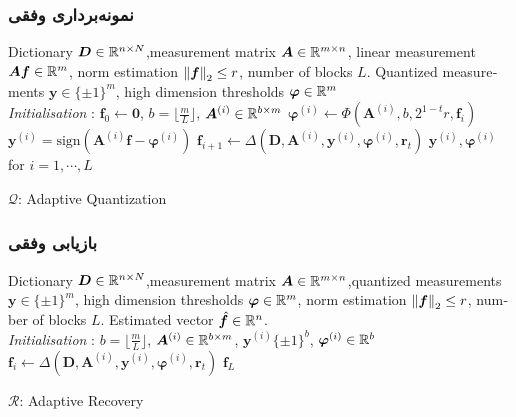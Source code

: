 \begin{frame}
\frametitle{نمونه‌برداری وفقی}
\begin{latin}
\begin{algorithm}[H]
\begin{algorithmic}[1]
\REQUIRE Dictionary $ \bm{D}\in\mathbb{R}^{n\times N} $,measurement matrix $ \bm{A}\in\mathbb{R}^{m\times n} $, linear measurement $ \bm{Af}\in \mathbb{R}^{m} $, norm estimation $ \left\lVert\bm{f}\right\rVert_{2}\leq r $, number of blocks $ L $.
\ENSURE  Quantized measurements $ \bm{y} \in \lbrace\pm 1\rbrace^{m} $, high dimension thresholds $ \bm{\varphi} \in \mathbb{R}^{m} $
\\ \textit{Initialisation} : $ \bm{f}_{0}\leftarrow \bm{0} $, $ b = \lfloor\frac{m}{L}\rfloor $, $ \bm{A}^{(i)}\in \mathbb{R}^{b\times m}  $
\STATE $\bm{\varphi}^{\left(i\right)}\leftarrow \Phi(\bm{A}^{(i)},b,2^{1-t}r,\bm{f}_{i}) $
\STATE $ \bm{y}^{\left(i\right)} = \text{sign}\left(\bm{A}^{(i)}\bm{f}-\bm{\varphi}^{\left(i\right)}\right)$
\STATE $ \bm{f}_{i+1}\leftarrow \varDelta\left(\bm{D},\bm{A}^{(i)},\bm{y}^{\left(i\right)},\bm{\varphi}^{\left(i\right)},\bm{r}_{t}\right) $
\ENDFOR
\RETURN $ \bm{y}^{\left(i\right)},\bm{\varphi}^{\left(i\right)} $ for $ i=1,\cdots,L $
\end{algorithmic} 
\caption{$ \mathcal{Q} $: Adaptive Quantization}
\label{alg:AQ}
\end{algorithm}
\end{latin}
\end{frame}

\begin{frame}
\frametitle{بازیابی وفقی}
\begin{latin}
\begin{algorithm}[H]
\begin{algorithmic}[1]
\REQUIRE Dictionary $ \bm{D}\in\mathbb{R}^{n\times N} $,measurement matrix $ \bm{A}\in\mathbb{R}^{m\times n} $,quantized measurements $ \bm{y} \in \lbrace\pm 1\rbrace^{m} $, high dimension thresholds $ \bm{\varphi}\in\mathbb{R}^{m} $, norm estimation $ \left\lVert\bm{f}\right\rVert_{2}\leq r $, number of blocks $ L $.
\ENSURE  Estimated vector $ \hat{\bm{f}}\in \mathbb{R}^{n} $.
\\ \textit{Initialisation} :  $ b = \lfloor\frac{m}{L}\rfloor $, $ \bm{A}^{(i)}\in \mathbb{R}^{b\times m}$, $ \bm{y}^{\left(i\right)} \lbrace\pm 1\rbrace^{b}$, $\bm{\varphi}^{\left(i\right)}\in \mathbb{R}^{b} $
\STATE $ \bm{f}_{i}\leftarrow \varDelta\left(\bm{D},\bm{A}^{(i)},\bm{y}^{\left(i\right)},\bm{\varphi}^{\left(i\right)},\bm{r}_{t}\right) $
\ENDFOR
\RETURN $ \bm{f}_{L} $
\end{algorithmic} 
\caption{$ \mathcal{R} $: Adaptive Recovery}
\label{alg:AR}
\end{algorithm}
\end{latin}
\end{frame}

